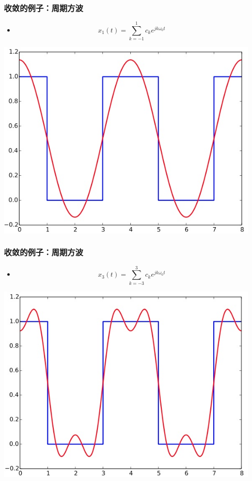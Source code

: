 \documentclass[CJKutf8,xcolor=pdftex,dvipsnames,table]{beamer}
\begin{document}
\begin{CJK*}{UTF8}{song}
  \begin{frame}
    \frametitle{收敛的例子：周期方波}
    \begin{itemize}
    \item \[ x_{1}(t)=\sum_{k=-1}^{1}c_k e^{jk\omega_0 t} \]
    \end{itemize}
    \begin{center}
      \includegraphics[scale=.4]{ss-c-f3-9a}
    \end{center}
  \end{frame} 
  
  \begin{frame}
    \frametitle{收敛的例子：周期方波}
    \begin{itemize}
    \item \[ x_{3}(t)=\sum_{k=-3}^{3}c_k e^{jk\omega_0 t} \]
    \end{itemize}
    \begin{center}
      \includegraphics[scale=.4]{ss-c-f3-9b}
    \end{center}
  \end{frame}     
     

\end{CJK*}
\end{document}
